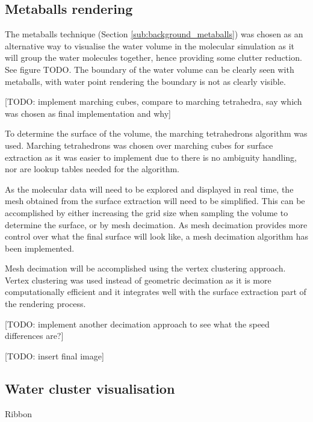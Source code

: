 
\subsection{Metaballs rendering}
\label{sub:design_metaballs}

The metaballs technique (Section \ref{sub:background_metaballs}) was chosen as
an alternative way to visualise the water volume in the molecular simulation as
it will group the water molecules together, hence providing some clutter
reduction. See figure TODO. The boundary of the water volume can be clearly
seen with metaballs, with water point rendering the boundary is not as clearly
visible.

[TODO: implement marching cubes, compare to marching tetrahedra, say which was
chosen as final implementation and why]

To determine the surface of the volume, the marching tetrahedrons algorithm was
used. Marching tetrahedrons was chosen over marching cubes for surface
extraction as it was easier to implement due to there is no ambiguity handling,
nor are lookup tables needed for the algorithm.

As the molecular data will need to be explored and displayed in real time, the
mesh obtained from the surface extraction will need to be simplified. This can
be accomplished by either increasing the grid size when sampling the volume to
determine the surface, or by mesh decimation. As mesh decimation provides more
control over what the final surface will look like, a mesh decimation algorithm
has been implemented.

Mesh decimation will be accomplished using the vertex clustering approach.
Vertex clustering was used instead of geometric decimation as it is more
computationally efficient and it integrates well with the surface extraction
part of the rendering process.

[TODO: implement another decimation approach to see what the speed differences
are?]

[TODO: insert final image]


\subsection{Water cluster visualisation}
\label{sub:design_watercluster}

Ribbon

